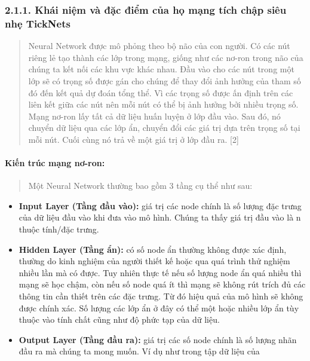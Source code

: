\documentclass[
]{article}
\begin{document}
\subsubsection{2.1.1. Khái niệm và đặc điểm của họ mạng tích chập siêu nhẹ TickNets}\label{2-1-1-concept}

\begin{quote}
Neural Network được mô phỏng theo bộ não của con người. Có các nút riêng
lẻ tạo thành các lớp trong mạng, giống như các nơ-ron trong não của
chúng ta kết nối các khu vực khác nhau. Đầu vào cho các nút trong một
lớp sẽ có trọng số được gán cho chúng để thay đổi ảnh hưởng của tham số
đó đến kết quả dự đoán tổng thể. Vì các trọng số được ấn định trên các
liên kết giữa các nút nên mỗi nút có thể bị ảnh hưởng bởi nhiều trọng
số. Mạng nơ-ron lấy tất cả dữ liệu huấn luyện ở lớp đầu vào. Sau đó, nó
chuyển dữ liệu qua các lớp ẩn, chuyển đổi các giá trị dựa trên trọng số
tại mỗi nút. Cuối cùng nó trả về một giá trị ở lớp đầu ra. {[}2{]}
\end{quote}

\paragraph{Kiến trúc mạng nơ-ron:}\label{kiux1ebfn-truxfac-mux1ea1ng-nux1a1-ron}

\begin{quote}
Một Neural Network thường bao gồm 3 tầng cụ thể như sau:
\end{quote}

\begin{itemize}
\item
  \textbf{Input Layer (Tầng đầu vào):} giá trị các node chính là số
  lượng đặc trưng của dữ liệu đầu vào khi đưa vào mô hình. Chúng ta thấy
  giá trị đầu vào là n thuộc tính/đặc trưng.
\item
  \textbf{Hidden Layer (Tầng ẩn):} có số node ẩn thường không được xác
  định, thường do kinh nghiệm của người thiết kế hoặc qua quá trình thử
  nghiệm nhiều lần mà có được. Tuy nhiên thực tế nếu số lượng node ẩn
  quá nhiều thì mạng sẽ học chậm, còn nếu số node quá ít thì mạng sẽ
  không rút trích đủ các thông tin cần thiết trên các đặc trưng. Từ đó
  hiệu quả của mô hình sẽ không được chính xác. Số lượng các lớp ẩn ở
  đây có thể một hoặc nhiều lớp ẩn tùy thuộc vào tính chất cũng như độ
  phức tạp của dữ liệu.
\item
  \textbf{Output Layer (Tầng đầu ra):} giá trị các số node chính là số
  lượng nhãn đầu ra mà chúng ta mong muốn. Ví dụ như trong tập dữ liệu
  của
\end{itemize}
\end{document}
